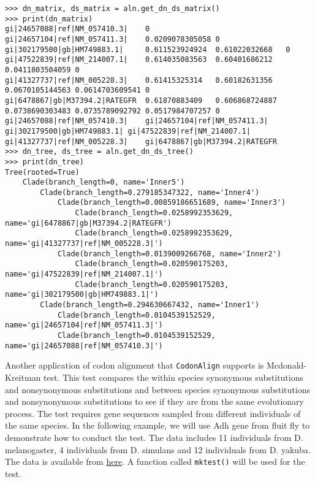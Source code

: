 \begin{verbatim}
>>> dn_matrix, ds_matrix = aln.get_dn_ds_matrix()
>>> print(dn_matrix)
gi|24657088|ref|NM_057410.3|    0
gi|24657104|ref|NM_057411.3|    0.0209078305058 0
gi|302179500|gb|HM749883.1|     0.611523924924  0.61022032668   0
gi|47522839|ref|NM_214007.1|    0.614035083563  0.60401686212   0.0411803504059 0
gi|41327737|ref|NM_005228.3|    0.61415325314   0.60182631356   0.0670105144563 0.0614703609541 0
gi|6478867|gb|M37394.2|RATEGFR  0.61870883409   0.606868724887  0.0738690303483 0.0735789092792 0.0517984707257 0
gi|24657088|ref|NM_057410.3|    gi|24657104|ref|NM_057411.3|    gi|302179500|gb|HM749883.1| gi|47522839|ref|NM_214007.1|    gi|41327737|ref|NM_005228.3|    gi|6478867|gb|M37394.2|RATEGFR
>>> dn_tree, ds_tree = aln.get_dn_ds_tree()
>>> print(dn_tree)
Tree(rooted=True)
    Clade(branch_length=0, name='Inner5')
        Clade(branch_length=0.279185347322, name='Inner4')
            Clade(branch_length=0.00859186651689, name='Inner3')
                Clade(branch_length=0.0258992353629, name='gi|6478867|gb|M37394.2|RATEGFR')
                Clade(branch_length=0.0258992353629, name='gi|41327737|ref|NM_005228.3|')
            Clade(branch_length=0.0139009266768, name='Inner2')
                Clade(branch_length=0.020590175203, name='gi|47522839|ref|NM_214007.1|')
                Clade(branch_length=0.020590175203, name='gi|302179500|gb|HM749883.1|')
        Clade(branch_length=0.294630667432, name='Inner1')
            Clade(branch_length=0.0104539152529, name='gi|24657104|ref|NM_057411.3|')
            Clade(branch_length=0.0104539152529, name='gi|24657088|ref|NM_057410.3|')
\end{verbatim}

Another application of codon alignment that \verb|CodonAlign| supports
is Mcdonald-Kreitman test. This test compares the within species
synonymous substitutions and nonsynonymous substitutions and between
species synonymous substitutions and nonsynonymous substitutions to see
if they are from the same evolutionary process. The test requires gene
sequences sampled from different individuals of the same species. In the
following example, we will use Adh gene from fluit fly to demonstrate
how to conduct the test. The data includes 11 individuals from
D. melanogaster, 4 individuals from D. simulans and 12 individuals from
D. yakuba. The data is available from
\href{http://zruanweb.com/adh.zip}{here}. A function called
\verb|mktest()| will be used for the test.

